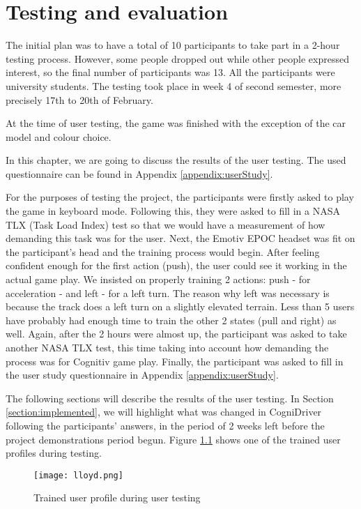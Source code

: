 \chapter{Testing and evaluation}
\label{cha:testing}

The initial plan was to have a total of 10 participants to take part in a 2-hour testing process. However, some people dropped out while other people expressed interest, so the final number of participants was 13. All the participants were university students. The testing took place in week 4 of second semester, more precisely 17th to 20th of February.

At the time of user testing, the game was finished with the exception of the car model and colour choice.

In this chapter, we are going to discuss the results of the user testing. The used questionnaire can be found in Appendix \ref{appendix:userStudy}. 

For the purposes of testing the project, the participants were firstly asked to play the game in keyboard mode. Following this, they were asked to fill in a NASA TLX (Task Load Index) test so that we would have a measurement of how demanding this task was for the user. Next, the Emotiv EPOC headset was fit on the participant's head and the training process would begin. After feeling confident enough for the first action (push), the user could see it working in the actual game play. We insisted on properly training 2 actions: push - for acceleration - and left - for a left turn. The reason why left was necessary is because the track does a left turn on a slightly elevated terrain. Less than 5 users have probably had enough time to train the other 2 states (pull and right) as well. Again, after the 2 hours were almost up, the participant was asked to take another NASA TLX test, this time taking into account how demanding the process was for Cognitiv game play. Finally, the participant was asked to fill in the user study questionnaire in Appendix \ref{appendix:userStudy}. 

The following sections will describe the results of the user testing. In Section \ref{section:implemented}, we will highlight what was changed in CogniDriver following the participants' answers, in the period of 2 weeks left before the project demonstrations period begun. Figure \ref{fig:testing} shows one of the trained user profiles during testing.

\begin{figure}
  \centering
  \texttt{[image: lloyd.png]}
  \caption{Trained user profile during user testing}
    \label{fig:testing}           
\end{figure}

